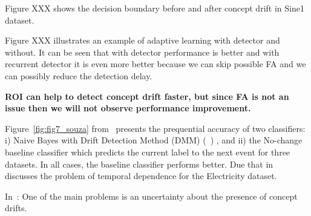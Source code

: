 \documentclass[12 pt]{article}
\begin{document}
  Figure XXX shows the decision boundary before and after concept drift in Sine1 dataset.

  Figure XXX illustrates an example of adaptive learning with detector and without. 
  It can be seen that with detector performance is better and with recurrent detector it is even more better because we can skip possible FA and we can possibly reduce the detection delay.
  
  \textbf{ROI can help to detect concept drift faster, but since FA is not an issue then we will not observe performance improvement.}

  Figure~\ref{fig:fig7_souza} from~\cite{SouzaRMB20} presents the prequential accuracy of two classifiers: i) Naive Bayes with Drift Detection Method (DMM) (~\cite{gama2004learning}) , and ii) the No-change baseline classifier which predicts the current label to the next event for three datasets. In all cases, the baseline classifier performs better.
  Due that in~\cite{zliobaite2013good} discusses the problem of temporal dependence for the Electricity dataset.
  
  In~\cite{SouzaRMB20}: One of the main problems is an uncertainty about the presence of concept drifts.
\end{document}

